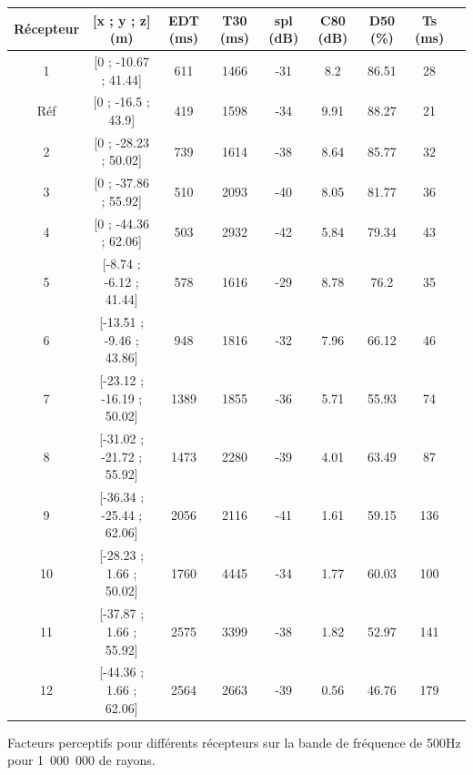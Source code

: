 \begin{tableth} 
\footnotesize
 \begin{tabular}{| *{9}{c|}} 
 \hline 
 Récepteur & [x ; y ; z] (m)  & \gls{EDT} (ms) & \gls{T30} (ms) & \gls{spl} (dB) & \gls{C80} (dB) & \gls{D50} (\%) & \gls{Ts} (ms) \\ %
 \hline 
 \hline 
1  & [0 ; -10.67 ; 41.44] & 611&  1466 &-31&8.2&86.51&28\\ %
 \hline 
 Réf    &[0 ; -16.5 ; 43.9] &419&1598& -34&9.91& 88.27&21\\ %
 \hline 
 2  & [0 ; -28.23 ; 50.02] &  739  & 1614 & -38 &  8.64 & 85.77 & 32 \\ %
 \hline 
 3  &  [0 ; -37.86 ; 55.92] & 510 & 2093  & -40 & 8.05 & 81.77 & 36 \\ %
 \hline 
 4  &  [0 ; -44.36 ; 62.06] & 503 &  2932 &  -42 & 5.84 & 79.34 & 43 \\ %
 \hline 
 \hline
 5  &   [-8.74 ; -6.12 ; 41.44] &578 & 1616 &  -29 & 8.78 & 76.2 & 35 \\ %
 \hline 
 6  &  [-13.51 ; -9.46 ; 43.86] &  948 &  1816 & -32 & 7.96 &  66.12 & 46\\ %
 \hline 
  7 &   [-23.12 ; -16.19 ; 50.02] &  1389 & 1855 &  -36 & 5.71 & 55.93 & 74 \\ %
 \hline 
 8  &  [-31.02 ; -21.72 ; 55.92] &  1473 & 2280 & -39 & 4.01 & 63.49 & 87 \\ %
 \hline 
 9  & [-36.34 ; -25.44 ; 62.06] &  2056 & 2116& -41& 1.61& 59.15 & 136 \\ %
 \hline 
 \hline
 10  &  [-28.23 ; 1.66 ; 50.02] & 1760 & 4445 & -34 & 1.77 & 60.03 & 100 \\ %
 \hline 
11   & [-37.87 ; 1.66 ; 55.92] & 2575 & 3399 & -38 & 1.82 & 52.97 & 141 \\ %
 \hline 
12   & [-44.36 ; 1.66 ; 62.06] & 2564 & 2663 & -39 & 0.56 & 46.76 & 179 \\ %
 \hline 
\end{tabular} 
 \caption{Facteurs perceptifs pour différents récepteurs sur la bande de fréquence de 500Hz pour 1~000~000 de rayons.} 
 \label{tab_fac_rec} 
 \end{tableth}
